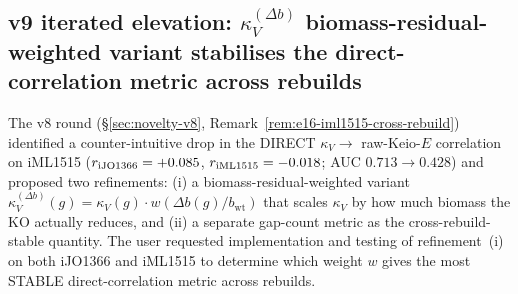 \documentclass[11pt,a4paper]{article}
\theoremstyle{plain}
\theoremstyle{definition}
\theoremstyle{remark}
\begin{document}
\subsection{v9 iterated elevation: $\kappa_V^{(\Delta b)}$
biomass-residual-weighted variant stabilises the direct-correlation
metric across rebuilds}
\label{sec:novelty-v9}

The v8 round (\S\ref{sec:novelty-v8}, Remark~\ref{rem:e16-iml1515-cross-rebuild})
identified a counter-intuitive drop in the DIRECT $\kappa_V \to$
raw-Keio-$E$ correlation on iML1515 ($r_{\textnormal{iJO1366}} = +0.085$,
$r_{\textnormal{iML1515}} = -0.018$; AUC $0.713 \to 0.428$) and proposed
two refinements: (i) a biomass-residual-weighted variant
$\kappa_V^{(\Delta b)}(g) = \kappa_V(g) \cdot w(\Delta b(g)/b_{\mathrm{wt}})$
that scales $\kappa_V$ by how much biomass the KO actually reduces, and
(ii) a separate gap-count metric as the cross-rebuild-stable quantity.
The user requested implementation and testing of refinement~(i) on
both iJO1366 and iML1515 to determine which weight $w$ gives the most
STABLE direct-correlation metric across rebuilds.
\end{document}
